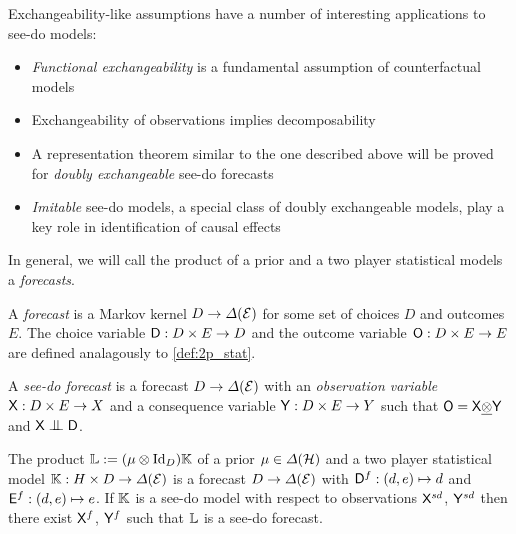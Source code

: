 Exchangeability-like assumptions have a number of interesting applications to see-do models:
\begin{itemize}
    \item \emph{Functional exchangeability} is a fundamental assumption of counterfactual models
    \item Exchangeability of observations implies decomposability
    \item A representation theorem similar to the one described above will be proved for \emph{doubly exchangeable} see-do forecasts
    \item \emph{Imitable} see-do models, a special class of doubly exchangeable models, play a key role in identification of causal effects
\end{itemize}

In general, we will call the product of a prior and a two player statistical models a \emph{forecasts}.


\begin{definition}
A \emph{forecast} is a Markov kernel $D\to \Delta(\mathcal{E})$ for some set of choices $D$ and outcomes $E$. The choice variable $\mathsf{D}:D\times E\to D$ and the outcome variable $\mathsf{O}:D\times E\to E$ are defined analagously to \ref{def:2p_stat}.

A \emph{see-do forecast} is a forecast $D\to \Delta(\mathcal{E})$ with an \emph{observation variable} $\mathsf{X}:D\times E\to X$ and a consequence variable $\mathsf{Y}:D\times E\to Y$ such that $\mathsf{O}=\mathsf{X}\underline{\otimes}\mathsf{Y}$ and $\RV{X}\CI\RV{D}$.
\end{definition}


\begin{theorem}
The product $\mathbb{L}:=(\mu\otimes \mathrm{Id}_D)\mathbb{K}$ of a prior $\mu\in \Delta(\mathcal{H})$ and a two player statistical model $\mathbb{K}:H\times D\to \Delta(\mathcal{E})$ is a forecast $D\to \Delta(\mathcal{E})$ with $\mathsf{D}^f:(d,e)\mapsto d$ and $\mathsf{E}^f:(d,e)\mapsto e$. If $\mathbb{K}$ is a see-do model with respect to observations $\mathsf{X}^{sd}$, $\mathsf{Y}^{sd}$ then there exist $\mathsf{X}^{f}$, $\mathsf{Y}^f$ such that $\mathbb{L}$ is a see-do forecast.
\end{theorem}


